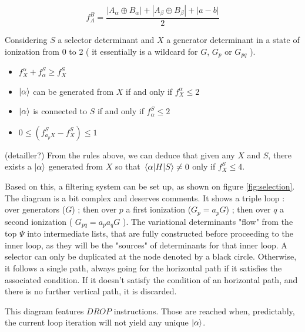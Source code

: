 \documentclass[./thesis.tex]{subfiles}
\begin{document}
$$f_A^B = \frac{|A_\alpha \oplus B_\alpha| + |A_\beta \oplus B_\beta| + |a-b|}{2}$$

Considering $S$ a selector determinant and $X$ a generator determinant in a state of ionization from 0 to 2 ( it essentially is a wildcard for $G$, $G_p$ or $G_{pq}$ ).

\begin{itemize}
\item
$f_X^\alpha + f_\alpha^S \geq f_X^S$
\item
$\ket \alpha$ can be generated from $X$ if and only if $f_X^\alpha \leq 2$
\item
$\ket \alpha$ is connected to $S$ if and only if $f_\alpha^S \leq 2$
\item
$0 \leq (f_{a_p X}^S - f_X^S) \leq 1$
\end{itemize}

(detailler?)
From the rules above, we can deduce that given any $X$ and $S$, there exists a $\ket \alpha$ generated from $X$ so that $\mel{\alpha}{H}{S} \neq 0$ only if $f_X^S \leq 4$.

Based on this, a filtering system can be set up, as shown on figure \ref{fig:selection}.\\

The diagram is a bit complex and deserves comments. 
It shows a triple loop : over generators ($G$) ; then over $p$ a first ionization ($G_p = a_p G$) ; then over $q$ a second ionization ( $G_{pq} = a_p a_q G$ ). The variational determinants "flow" from the top $\Psi$ into intermediate lists, that are fully constructed before proceeding to the inner loop, as they will be the "sources" of determinants for that inner loop.
A selector can only be duplicated at the node denoted by a black circle. Otherwise, it follows a single path, always going for the horizontal path if it satisfies the associated condition.
If it doesn't satisfy the condition of an horizontal path, and there is no further vertical path, it is discarded.

This diagram features $DROP$ instructions. Those are reached when, predictably, the current loop iteration will not yield any unique $\ket \alpha$. 
\end{document}
